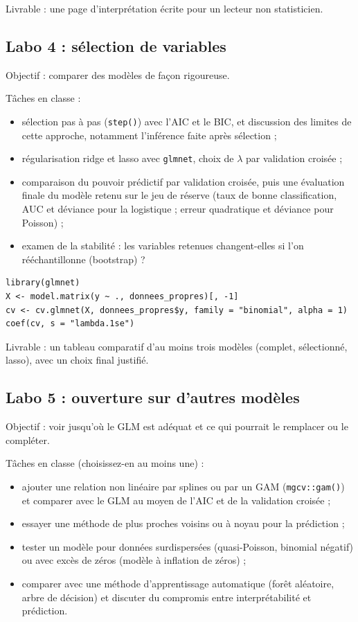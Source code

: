 \documentclass[11pt,letterpaper]{scrartcl}
\begin{document}
Livrable : une page d'interprétation écrite pour un lecteur non statisticien.

\subsection{Labo 4 : sélection de variables}

Objectif : comparer des modèles de façon rigoureuse.

Tâches en classe :
\begin{itemize}
  \item sélection pas à pas (\texttt{step()}) avec l'AIC et le BIC, et discussion des limites de cette approche, notamment l'inférence faite après sélection ;
  \item régularisation ridge et lasso avec \texttt{glmnet}, choix de $\lambda$ par validation croisée ;
  \item comparaison du pouvoir prédictif par validation croisée, puis une évaluation finale du modèle retenu sur le jeu de réserve (taux de bonne classification, AUC et déviance pour la logistique ; erreur quadratique et déviance pour Poisson) ;
  \item examen de la stabilité : les variables retenues changent-elles si l'on rééchantillonne (bootstrap) ?
\end{itemize}

\begin{lstlisting}
library(glmnet)
X <- model.matrix(y ~ ., donnees_propres)[, -1]
cv <- cv.glmnet(X, donnees_propres$y, family = "binomial", alpha = 1)
coef(cv, s = "lambda.1se")
\end{lstlisting}

Livrable : un tableau comparatif d'au moins trois modèles (complet, sélectionné, lasso), avec un choix final justifié.

\subsection{Labo 5 : ouverture sur d'autres modèles}

Objectif : voir jusqu'où le GLM est adéquat et ce qui pourrait le remplacer ou le compléter.

Tâches en classe (choisissez-en au moins une) :
\begin{itemize}
  \item ajouter une relation non linéaire par splines ou par un GAM (\texttt{mgcv::gam()}) et comparer avec le GLM au moyen de l'AIC et de la validation croisée ;
  \item essayer une méthode de plus proches voisins ou à noyau pour la prédiction ;
  \item tester un modèle pour données surdispersées (quasi-Poisson, binomial négatif) ou avec excès de zéros (modèle à inflation de zéros) ;
  \item comparer avec une méthode d'apprentissage automatique (forêt aléatoire, arbre de décision) et discuter du compromis entre interprétabilité et prédiction.
\end{itemize}
\end{document}
